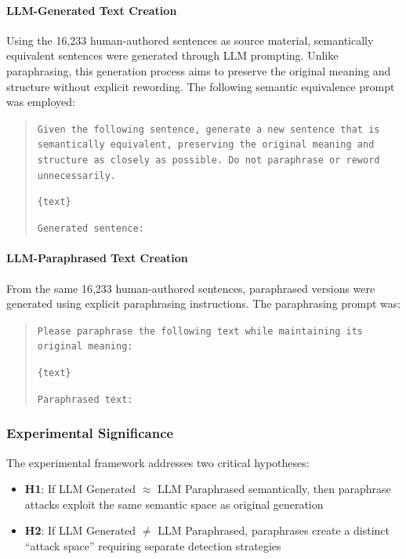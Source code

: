 \paragraph{LLM-Generated Text Creation}
\label{app:experiment1_llm_generated}
Using the 16,233 human-authored sentences as source material, semantically equivalent sentences were generated through LLM prompting. Unlike paraphrasing, this generation process aims to preserve the original meaning and structure without explicit rewording. The following semantic equivalence prompt was employed:

\begin{quote}
\small
\texttt{Given the following sentence, generate a new sentence that is semantically equivalent, preserving the original meaning and structure as closely as possible. Do not paraphrase or reword unnecessarily.}

\texttt{\{text\}}

\texttt{Generated sentence:}
\end{quote}

\paragraph{LLM-Paraphrased Text Creation}
\label{app:experiment1_paraphrased}
From the same 16,233 human-authored sentences, paraphrased versions were generated using explicit paraphrasing instructions. The paraphrasing prompt was:

\begin{quote}
\small
\texttt{Please paraphrase the following text while maintaining its original meaning:}

\texttt{\{text\}}

\texttt{Paraphrased text:}
\end{quote}

\subsubsection{Experimental Significance}
The experimental framework addresses two critical hypotheses:
\begin{itemize}
    \item \textbf{H1}: If LLM Generated $\approx$ LLM Paraphrased semantically, then paraphrase attacks exploit the same semantic space as original generation
    \item \textbf{H2}: If LLM Generated $\neq$ LLM Paraphrased, paraphrases create a distinct ``attack space'' requiring separate detection strategies
\end{itemize}

